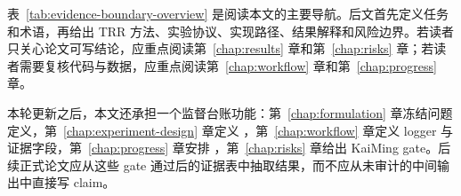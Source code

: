 \begin{table}[H]
	\centering
	\caption{本文证据层级与允许使用方式。}
	\label{tab:evidence-boundary-overview}
	\small
	\end{table}

表~\ref{tab:evidence-boundary-overview} 是阅读本文的主要导航。后文首先定义任务和术语，再给出 TRR 方法、实验协议、实现路径、结果解释和风险边界。若读者只关心论文可写结论，应重点阅读第~\ref{chap:results} 章和第~\ref{chap:risks} 章；若读者需要复核代码与数据，应重点阅读第~\ref{chap:workflow} 章和第~\ref{chap:progress} 章。

本轮更新之后，本文还承担一个监督台账功能：第~\ref{chap:formulation} 章冻结问题定义，第~\ref{chap:experiment-design} 章定义 ，第~\ref{chap:workflow} 章定义 logger 与证据字段，第~\ref{chap:progress} 章安排 ，第~\ref{chap:risks} 章给出 KaiMing gate。后续正式论文应从这些 gate 通过后的证据表中抽取结果，而不应从未审计的中间输出中直接写 claim。

